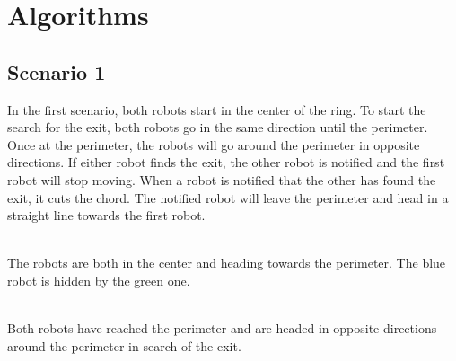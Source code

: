 \documentclass[12pt,letterpaper]{article}
\begin{document}
    \section{Algorithms}
    \subsection{Scenario 1}
        In the first scenario, both robots start in the center of the ring. To start the search for the exit, both robots go in the same direction until the perimeter. Once at the perimeter, the robots will go around the perimeter in opposite directions. If either robot finds the exit, the other robot is notified and the first robot will stop moving. When a robot is notified that the other has found the exit, it cuts the chord. The notified robot will leave the perimeter and head in a straight line towards the first robot.
        
        \begin{center}
             \\
            The robots are both in the center and heading towards the perimeter. The blue robot is hidden by the green one.
        \end{center}
        
        
        \begin{center}
             \\
            Both robots have reached the perimeter and are headed in opposite directions around the perimeter in search of the exit.
        \end{center}
        
\end{document}
